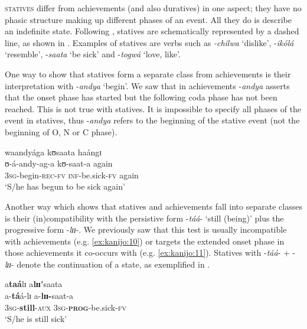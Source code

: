 \documentclass[output=paper,newtxmath,modfonts,nonflat,draftmode]{langsci/langscibook}
\begin{document}
\textsc{statives} differ from achievements (and also duratives) in one aspect; they have no phasic structure making up different phases of an event. All they do is describe an indefinite state. Following \citet{Kershner2002}, statives are schematically represented by a dashed line, as shown in . Examples of statives are verbs such as \textit{-chilwa} ‘dislike’, -\textit{ikólá} ‘resemble’, -\textit{saata} ‘be sick’ and -\textit{togwá} ‘love, like’. 

One way to show that statives form a separate class from achievements is their interpretation with -\textit{andya} ‘begin’. We saw that in achievements -\textit{andya} asserts that the onset phase has started but the following coda phase has not been reached. This is not true with statives. It is impossible to specify all phases of the event in statives, thus -\textit{andya} refers to the beginning of the stative event (not the beginning of O, N or C phase).

\ea \label{ex:kanijo:12}
\glll waandyága      kʊsaata          haángɪ \\
ʊ-á-andy-ag-a kʊ-saat-a again\\
3\textsc{sg}-begin-\textsc{rec}-\textsc{fv} \textsc{inf}-be.sick-\textsc{fv} again\\ 
\glt ‘S/he has begun to be sick again’\\
\z

Another way which shows that statives and achievements fall into separate classes is their (in)compatibility with the persistive form -\textit{táá}- ‘still (being)’ plus the progressive form -\textit{lɪɪ}-. We previously saw that this test is usually incompatible with achievements (e.g. \ref{ex:kanijo:10}) or targets the extended onset phase in those achievements it co-occurs with (e.g. \ref{ex:kanijo:11}). Statives with -\textit{táá}- + -\textit{lɪɪ}- denote the continuation of a state, as exemplified in . 

\ea \label{ex:kanijo:13}
\glll a\textbf{taá}lɪ      a\textbf{l}\textbf{ɪɪ}\textbf{\'{}}saata\\
a-\textbf{tá}á-lɪ             a-\textbf{lɪɪ}\textbf{-}saat-a\\
3\textsc{sg}-\textbf{still}-\textsc{aux} 3\textsc{sg}-\textbf{\textsc{prog}}-be.sick-\textsc{fv}\\
\glt ‘S/he is still sick’
\z
\end{document}
